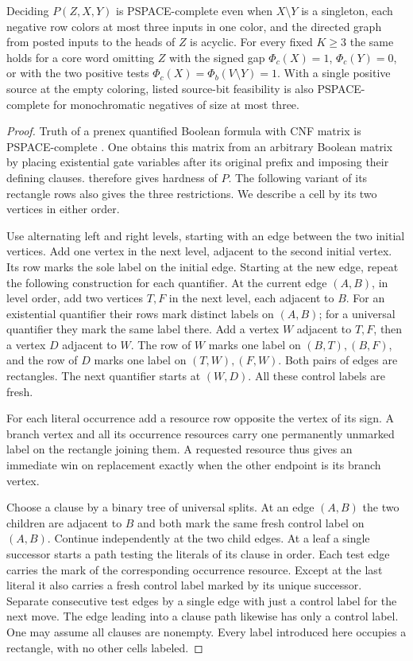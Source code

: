 \begin{theorem}
\label{core:thm:two-color-pspace}
Deciding $P(Z,X,Y)$ is PSPACE-complete even when $X\setminus Y$ is
a singleton, each negative row colors at most three inputs in one
color, and the directed graph from posted inputs to the heads of $Z$
is acyclic. For every fixed $K\ge3$ the same holds for a core word
omitting $Z$ with the signed gap $\Phi_c(X)=1$, $\Phi_c(Y)=0$,
or with the two positive tests $\Phi_c(X)=\Phi_b(V\setminus Y)=1$.
With a single positive source at the empty coloring, listed source-bit
feasibility is also PSPACE-complete for monochromatic negatives of
size at most three.
\end{theorem}
\begin{proof}
Truth of a prenex quantified Boolean formula with CNF matrix is
PSPACE-complete \cite[Theorem~4.3]{StockmeyerMeyer1973}. One obtains this
matrix from an arbitrary Boolean matrix by placing existential gate
variables after its original prefix and imposing their defining clauses.
 therefore gives hardness of $P$. The
following variant of its rectangle rows also gives the three restrictions.
We describe a cell by its two vertices in either order.

Use alternating left and right levels, starting with an edge between the
two initial vertices. Add one vertex in the next level, adjacent to the
second initial vertex. Its row marks the sole label on the initial edge.
Starting at the new edge, repeat the following construction for each quantifier.
At the current edge $(A,B)$, in level order, add two vertices $T,F$ in the
next level, each adjacent to $B$. For an existential quantifier their rows mark
distinct labels on $(A,B)$; for a universal quantifier they mark the same
label there. Add a vertex $W$ adjacent to $T,F$, then a vertex $D$ adjacent
to $W$. The row of $W$ marks one label on $(B,T),(B,F)$, and the row of
$D$ marks one label on $(T,W),(F,W)$. Both pairs of edges are rectangles.
The next quantifier starts at $(W,D)$. All these control labels are fresh.

For each literal occurrence add a resource row opposite the vertex of
its sign. A branch vertex and all its occurrence resources carry one
permanently unmarked label on the rectangle joining them. A requested
resource thus gives an immediate win on replacement exactly when the
other endpoint is its branch vertex.

Choose a clause by a binary tree of universal splits. At an edge
$(A,B)$ the two children are adjacent to $B$ and both mark the same
fresh control label on $(A,B)$. Continue independently at the two
child edges. At a leaf a single successor starts a path testing the
literals of its clause in order. Each test edge carries the mark of
the corresponding occurrence resource. Except at the last literal it
also carries a fresh control label marked by its unique successor.
Separate consecutive test edges by a single edge with just a control
label for the next move. The edge leading into a clause path likewise
has only a control label. One may assume all clauses are nonempty.
Every label introduced here occupies a rectangle, with no other cells
labeled.


\end{proof}
